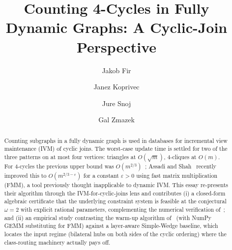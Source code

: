 \documentclass[sigconf,nonacm]{acmart}
\theoremstyle{plain}
\theoremstyle{definition}
\begin{document}
\raggedbottom

\title{Counting 4-Cycles in Fully Dynamic Graphs: A Cyclic-Join Perspective}

\author{Jakob Fir}

\author{Janez Koprivec}

\author{Jure Snoj}

\author{Gal Zmazek}

\begin{abstract}
Counting subgraphs in a fully dynamic graph is used in databases
for incremental view maintenance (IVM) of cyclic joins. The
worst-case update time is settled for two of the three patterns on
at most four vertices: triangles at $O(\sqrt{m})$, $4$-cliques at
$O(m)$. For $4$-cycles the previous upper bound was
$O(m^{2/3})$~\cite{HHH22}; Assadi and
Shah~\cite{AssadiShah25} recently improved this to
$O(m^{2/3-\varepsilon})$ for a constant $\varepsilon > 0$ using
fast matrix multiplication (FMM), a tool previously thought
inapplicable to dynamic IVM. This essay re-presents their algorithm
through the IVM-for-cyclic-joins lens and contributes (i) a
closed-form algebraic certificate that the underlying constraint
system is feasible at the conjectural $\omega = 2$ with explicit
rational parameters, complementing the numerical verification
of~\cite{AssadiShah25}; and (ii) an empirical study contrasting
the warm-up algorithm of~\cite[\S3]{AssadiShah25} (with NumPy GEMM
substituting for FMM) against a layer-aware Simple-Wedge baseline,
which locates the input regime (bilateral hubs on both sides of
the cyclic ordering) where the class-routing machinery actually
pays off.
\end{abstract}
\end{document}
